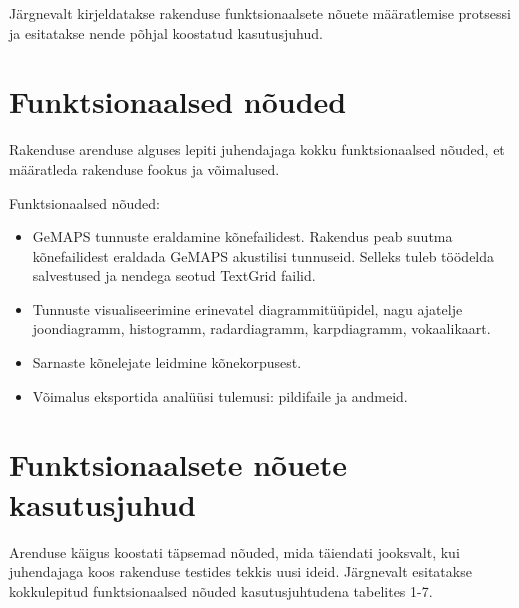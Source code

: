 Järgnevalt kirjeldatakse rakenduse funktsionaalsete nõuete määratlemise protsessi ja esitatakse nende põhjal koostatud kasutusjuhud.

\section{Funktsionaalsed nõuded}
Rakenduse arenduse alguses lepiti juhendajaga kokku funktsionaalsed nõuded, et määratleda rakenduse fookus ja võimalused. 

Funktsionaalsed nõuded:
\begin{itemize}
    \item GeMAPS tunnuste eraldamine kõnefailidest. Rakendus peab suutma kõnefailidest eraldada GeMAPS akustilisi tunnuseid. Selleks tuleb töödelda salvestused ja nendega seotud TextGrid failid.
   
    \item Tunnuste visualiseerimine erinevatel diagrammitüüpidel, nagu ajatelje joondiagramm, histogramm, radardiagramm, karpdiagramm, vokaalikaart.
    
    \item Sarnaste kõnelejate leidmine kõnekorpusest.

    \item Võimalus eksportida analüüsi tulemusi: pildifaile ja andmeid.
\end{itemize}

\section{Funktsionaalsete nõuete kasutusjuhud}
Arenduse käigus koostati täpsemad nõuded, mida täiendati jooksvalt, kui juhendajaga koos rakenduse testides tekkis uusi ideid. Järgnevalt esitatakse kokkulepitud funktsionaalsed nõuded kasutusjuhtudena tabelites 1-7.

